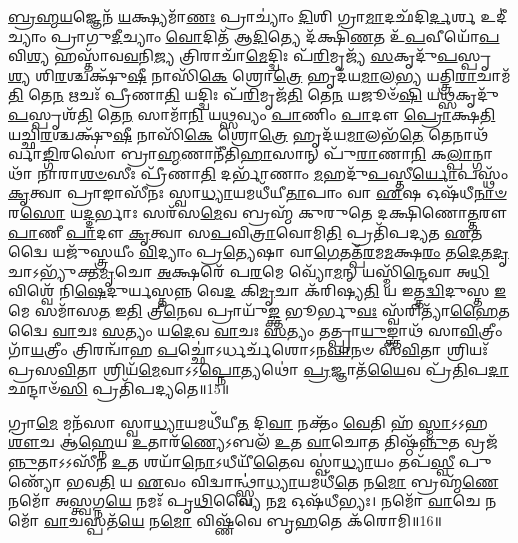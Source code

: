 \-\ul{𑌬𑍍𑌰}\-\-\ul{𑌹𑍍𑌮}\-\-\ul{𑌯}\-𑌜𑍍𑌞𑍇𑌨᳴ \ul{𑌯}\-𑌕𑍍𑌷𑍍𑌯𑌮𑌾᳴\-\ul{𑌣𑌃} 𑌪𑍍𑌰𑌾𑌚𑍍𑌯𑌾𑌂॑ \ul{𑌦𑌿}\-𑌶𑌿 𑌗𑍍𑌰𑌾\-\ul{𑌮𑌾}\-𑌦𑌛᳴𑌦𑌿\-\ul{𑌰𑍍𑌦}\-𑌰𑍍\mbox{}𑌶 𑌉𑌦𑍀॑𑌚𑍍𑌯𑌾𑌂 𑌪𑍍𑌰𑌾𑌗𑍁\-\ul{𑌦𑍀}\-𑌚𑍍𑌯𑌾𑌂 \ul{𑌵𑍋}\-𑌦𑌿𑌤᳴ 𑌆\-\ul{𑌦𑌿}\-𑌤𑍍𑌯𑍇 𑌦᳴𑌕𑍍𑌷𑌿\-\ul{𑌣}\-𑌤 𑌉᳴\-\ul{𑌪}\-𑌵𑍀𑌯𑍋᳴\-\ul{𑌪}\-𑌵𑌿\-\ul{𑌶𑍍𑌯} 𑌹𑌸𑍍𑌤𑌾᳴𑌵\-\ul{𑌵}\-𑌨𑌿\-\ul{𑌜𑍍𑌯} 𑌤𑍍𑌰𑌿𑌰𑌾𑌚𑌾᳴\-\ul{𑌮𑍇}\-𑌦𑍍𑌦𑍍𑌵𑌿𑌃 𑌪᳴\-\ul{𑌰𑌿}\-𑌮𑍃𑌜𑍍𑌯᳴ \ul{𑌸}\-𑌕𑍃𑌦𑍁᳴\-\ul{𑌪}\-𑌸𑍍𑌪𑍃\-\ul{𑌶𑍍𑌯} 𑌶𑌿\-\ul{𑌰}\-𑌶𑍍𑌚𑌕𑍍𑌷𑍁᳴\-\ul{𑌷𑍀} 𑌨𑌾𑌸𑌿᳴\-\ul{𑌕𑍇} 𑌶𑍍𑌰𑍋\-\ul{𑌤𑍍𑌰𑍇} 𑌹𑍃𑌦᳴𑌯\-\ul{𑌮𑌾}\-𑌲\-\ul{𑌭𑍍𑌯} 𑌯𑌤𑍍𑌤𑍍𑌰𑌿\-\ul{𑌰𑌾}\-𑌚𑌾𑌮᳴\-\ul{𑌤𑌿} 𑌤𑍇\-\ul{𑌨} 𑌋𑌚𑌃᳴ 𑌪𑍍𑌰𑍀𑌣𑌾\-\ul{𑌤𑌿} 𑌯𑌦𑍍𑌦𑍍𑌵𑌿𑌃 𑌪᳴\-\ul{𑌰𑌿}\-𑌮𑍃𑌜᳴\-\ul{𑌤𑌿} 𑌤𑍇\-\ul{𑌨} 𑌯𑌜𑍂𑍞᳴\-\ul{𑌷𑌿} 𑌯\-\ul{𑌥𑍍𑌸}\-𑌕𑍃𑌦𑍁᳴\-\ul{𑌪}\-𑌸𑍍𑌪𑍃𑌶᳴\-\ul{𑌤𑌿} 𑌤𑍇\-\ul{𑌨} 𑌸𑌾𑌮𑌾᳴\-\ul{𑌨𑌿} 𑌯\-\ul{𑌥𑍍𑌸}\-𑌵𑍍𑌯𑌂 \ul{𑌪𑌾}\-𑌣𑌿𑌂 \ul{𑌪𑌾}\-𑌦𑍗 \ul{𑌪𑍍𑌰𑍋}\-𑌕𑍍𑌷\-\ul{𑌤𑌿} 𑌯𑌚𑍍𑌛𑌿\-\ul{𑌰}\-𑌶𑍍𑌚𑌕𑍍𑌷𑍁᳴\-\ul{𑌷𑍀} 𑌨𑌾𑌸𑌿᳴\-\ul{𑌕𑍇} 𑌶𑍍𑌰𑍋\-\ul{𑌤𑍍𑌰𑍇} 𑌹𑍃𑌦᳴𑌯\-\ul{𑌮𑌾}\-𑌲𑌭᳴\-\ul{𑌤𑍇} 𑌤𑍇𑌨𑌾𑌥᳴𑌰𑍍𑌵𑌾\-\ul{𑌙𑍍𑌗𑌿}\-𑌰𑌸𑍋॑ 𑌬𑍍𑌰𑌾\-\ul{𑌹𑍍𑌮}\-𑌣𑌾𑌨𑍀᳴𑌤𑌿\-\ul{𑌹𑌾}\-𑌸𑌾𑌨𑍍 𑌪𑍁᳴\-\ul{𑌰𑌾}\-𑌣𑌾\-\ul{𑌨𑌿} 𑌕\-\ul{𑌲𑍍𑌪𑌾}\-𑌨𑍍𑌗𑌾𑌥𑌾᳴ 𑌨𑌾𑌰𑌾\-\ul{𑌶}\-\-\ul{𑍞}\-𑌸𑍀𑌃 𑌪𑍍𑌰𑍀᳴𑌣𑌾\-\ul{𑌤𑌿} 𑌦𑌰𑍍𑌭𑌾᳴𑌣𑌾𑌂 \ul{𑌮}\-𑌹𑌦𑍁᳴\-\ul{𑌪}\-𑌸𑍍𑌤𑍀\-\ul{𑌰𑍍𑌯𑍋}\-𑌪𑌸𑍍𑌥𑌂᳴ \ul{𑌕𑍃}\-𑌤𑍍𑌵𑌾 𑌪𑍍𑌰𑌾𑌙𑌾𑌸𑍀᳴𑌨𑌃 𑌸𑍍𑌵𑌾\-\ul{𑌧𑍍𑌯𑌾}\-𑌯𑌮𑌧𑍀᳴𑌯𑍀\-\ul{𑌤𑌾}\-𑌪𑌾𑌂 𑌵𑌾 \ul{𑌏}\-𑌷 𑌓𑌷᳴𑌧𑍀\-\ul{𑌨𑌾}\-\-\ul{𑍞} 𑌰\-\ul{𑌸𑍋} 𑌯\-\ul{𑌦𑍍𑌦}\-𑌰𑍍𑌭𑌾𑌃 𑌸𑌰᳴𑌸\-\ul{𑌮𑍇}\-𑌵 𑌬𑍍𑌰𑌹𑍍𑌮᳴ 𑌕𑍁𑌰𑍁𑌤𑍇 𑌦𑌕𑍍𑌷𑌿𑌣𑍋\-\ul{𑌤𑍍𑌤}\-𑌰𑍗 \ul{𑌪𑌾}\-𑌣𑍀 \ul{𑌪𑌾}\-𑌦𑍗 \ul{𑌕𑍃}\-𑌤𑍍𑌵𑌾 𑌸\-\ul{𑌪}\-𑌵𑌿\-\ul{𑌤𑍍𑌰𑌾}\-𑌵𑍋𑌮𑌿\-\ul{𑌤𑌿} 𑌪𑍍𑌰𑌤𑌿᳴𑌪𑌦𑍍𑌯𑌤 \ul{𑌏}\-𑌤𑌦𑍍𑌵𑍈 𑌯𑌜𑍁᳴𑌸𑍍𑌤𑍍𑌰𑌯𑍀𑌂 \ul{𑌵𑌿}\-𑌦𑍍𑌯𑌾𑌂 𑌪𑍍𑌰\-\ul{𑌤𑍍𑌯𑍇}\-𑌷𑌾 𑌵𑌾\-\ul{𑌗𑍇}\-𑌤𑌤𑍍𑌪᳴\-\ul{𑌰}\-𑌮\-\ul{𑌮}\-𑌕𑍍𑌷\-\ul{𑌰𑌂} 𑌤\-\ul{𑌦𑍇}\-𑌤\-\ul{𑌦𑍃}\-𑌚𑌾𑌽𑌭𑍍𑌯𑍁᳴𑌕𑍍𑌤\-\ul{𑌮𑍃}\-𑌚𑍋 \ul{𑌅}\-𑌕𑍍𑌷𑌰𑍇᳴ 𑌪\-\ul{𑌰}\-𑌮𑍇 𑌵𑍍𑌯𑍋᳴\-\ul{𑌮}\-𑌨𑍍 𑌯𑌸𑍍𑌮𑌿᳴\-\ul{𑌨𑍍𑌦𑍇}\-𑌵𑌾 𑌅\-\ul{𑌧𑌿} 𑌵𑌿𑌶𑍍𑌵𑍇᳴ 𑌨𑌿\-\ul{𑌷𑍇}\-𑌦𑍁𑌰𑍍𑌯𑌸𑍍𑌤𑌨𑍍𑌨 𑌵𑍇\-\ul{𑌦} 𑌕𑌿\-\ul{𑌮𑍃}\-𑌚𑌾 𑌕᳴𑌰𑌿𑌷𑍍𑌯\-\ul{𑌤𑌿} 𑌯 𑌇𑌤𑍍𑌤\-\ul{𑌦𑍍𑌵𑌿}\-𑌦𑍁𑌸𑍍𑌤 \ul{𑌇}\-𑌮𑍇 𑌸𑌮𑌾᳴𑌸\-\ul{𑌤} 𑌇\-\ul{𑌤𑌿} 𑌤𑍍𑌰𑍀\-\ul{𑌨𑍇}\-𑌵 𑌪𑍍𑌰𑌾𑌯𑍁᳴\-\ul{𑌙𑍍𑌕𑍍𑌤} 𑌭𑍂𑌰𑍍𑌭𑍁\-\ul{𑌵𑌃} 𑌸𑍍𑌵᳴𑌰𑌿𑌤𑍍𑌯𑌾᳴\-\ul{𑌹𑍈}\-𑌤𑌦𑍍𑌵𑍈 \ul{𑌵𑌾}\-𑌚𑌃 \ul{𑌸}\-𑌤𑍍𑌯𑌂 𑌯\-\ul{𑌦𑍇}\-𑌵 \ul{𑌵𑌾}\-𑌚𑌃 \ul{𑌸}\-𑌤𑍍𑌯𑌂 𑌤𑌤𑍍𑌪𑍍𑌰𑌾\-\ul{𑌯𑍁}\-𑌙𑍍𑌕𑍍𑌤𑌾𑌥᳴ 𑌸𑌾\-\ul{𑌵𑌿}\-𑌤𑍍𑌰𑍀𑌂 𑌗𑌾᳴\-\ul{𑌯}\-𑌤𑍍𑌰𑍀𑌂 𑌤𑍍𑌰𑌿𑌰𑌨𑍍𑌵𑌾᳴𑌹 \ul{𑌪}\-𑌚𑍍𑌛𑍋॑𑌽𑌰𑍍𑌧𑌰𑍍𑌚᳴𑌶𑍋𑌽𑌨\-\ul{𑌵𑌾}\-𑌨𑍞 𑌸᳴\-\ul{𑌵𑌿}\-𑌤𑌾 𑌶𑍍𑌰𑌿𑌯𑌃᳴ 𑌪𑍍𑌰𑌸\-\ul{𑌵𑌿}\-𑌤𑌾 𑌶𑍍𑌰𑌿𑌯᳴\-\ul{𑌮𑍇}\-𑌵𑌾𑌽𑌽\-\ul{𑌪𑍍𑌨𑍋}\-𑌤𑍍𑌯𑌥𑍋॑ \ul{𑌪𑍍𑌰}\-𑌜𑍍𑌞𑌾𑌤᳴\-\ul{𑌯𑍈}\-𑌵 𑌪𑍍𑌰᳴\-\ul{𑌤𑌿}\-𑌪\-\ul{𑌦𑌾} 𑌛𑌨𑍍𑌦𑌾𑍞᳴\-\ul{𑌸𑌿} 𑌪𑍍𑌰𑌤𑌿᳴𑌪𑌦𑍍𑌯𑌤𑍇॥15॥\anuvakamend


𑌗𑍍𑌰𑌾\-\ul{𑌮𑍇} 𑌮𑌨᳴𑌸𑌾 𑌸𑍍𑌵𑌾\-\ul{𑌧𑍍𑌯𑌾}\-𑌯𑌮𑌧𑍀᳴𑌯𑍀\-\ul{𑌤} 𑌦𑌿\-\ul{𑌵𑌾} 𑌨𑌕𑍍𑌤𑌂᳴ \ul{𑌵𑍇}\-𑌤𑌿 𑌹᳴ \ul{𑌸𑍍𑌮𑌾}\-𑌽𑌽𑌹 \ul{𑌶𑍗}\-𑌚 𑌆॑\-\ul{𑌹𑍍𑌨𑍇}\-𑌯 \ul{𑌉}\-𑌤𑌾𑌰᳴\-\ul{𑌣𑍍𑌯𑍇}\-𑌽𑌬𑌲᳴ \ul{𑌉}\-𑌤 \ul{𑌵𑌾}\-𑌚𑍋𑌤 𑌤𑌿𑌷𑍍𑌠᳴\-\ul{𑌨𑍍𑌨𑍁}\-𑌤 𑌵𑍍𑌰𑌜᳴\-\ul{𑌨𑍍𑌨𑍁}\-𑌤𑌾𑌽𑌽𑌸𑍀᳴𑌨 \ul{𑌉}\-𑌤 𑌶𑌯𑌾᳴\-\ul{𑌨𑍋}\-𑌽𑌧𑍀𑌯𑍀᳴\-\ul{𑌤𑍈}\-𑌵 𑌸𑍍𑌵𑌾॑\-\ul{𑌧𑍍𑌯𑌾}\-𑌯𑌂 𑌤𑌪᳴\-\ul{𑌸𑍍𑌵𑍀} 𑌪𑍁𑌣𑍍𑌯𑍋᳴ 𑌭𑌵\-\ul{𑌤𑌿} 𑌯 \ul{𑌏}\-𑌵𑌂 𑌵𑌿𑌦𑍍𑌵𑌾𑌨𑍍𑌥𑍍𑌸𑍍𑌵𑌾॑॑\-\ul{𑌧𑍍𑌯𑌾}\-𑌯𑌮𑌧𑍀᳴\-\ul{𑌤𑍇} 𑌨\-\ul{𑌮𑍋} 𑌬𑍍𑌰𑌹𑍍𑌮᳴\-\ul{𑌣𑍇} 𑌨𑌮𑍋᳴ 𑌅\-\ul{𑌸𑍍𑌤𑍍𑌵}\-𑌗𑍍𑌨\-\ul{𑌯𑍇} 𑌨𑌮𑌃᳴ 𑌪𑍃\-\ul{𑌥𑌿}\-𑌵𑍍𑌯𑍈 𑌨\-\ul{𑌮} 𑌓𑌷᳴𑌧𑍀𑌭𑍍𑌯𑌃। 
𑌨𑌮𑍋᳴ \ul{𑌵𑌾}\-𑌚𑍇 𑌨𑌮𑍋᳴ \ul{𑌵𑌾}\-𑌚𑌸𑍍𑌪𑌤᳴\-\ul{𑌯𑍇} 𑌨\-\ul{𑌮𑍋} 𑌵𑌿𑌷𑍍𑌣᳴𑌵𑍇 𑌬𑍃\-\ul{𑌹}\-𑌤𑍇 𑌕᳴𑌰𑍋𑌮𑌿॥16॥
\anuvakamend


